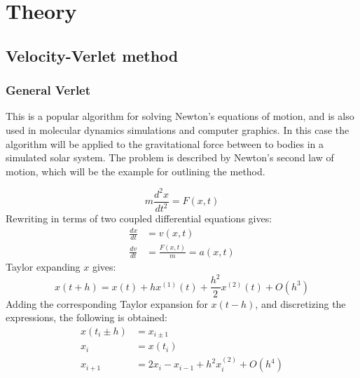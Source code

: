 \section{Theory}
\subsection{Velocity-Verlet method}
\subsubsection{General Verlet}
This is a popular algorithm for solving Newton's equations of motion, and is also used in  
molecular dynamics simulations and computer graphics. In this case the algorithm will be  
applied to the gravitational force between to bodies in a simulated solar system. 
The problem is described by Newton's second law of motion, which will be the example for outlining
the method.

\begin{equation*}
m\frac{d^2x}{dt^2}= F(x,t)
\end{equation*}
Rewriting in terms of two coupled differential equations gives:
\begin{align*}
\frac{dx}{dt} &= v(x,t) \\
\frac{dv}{dt} &= \frac{F(x,t)}{m} = a(x,t)
\end{align*}
Taylor expanding $x$ gives:
\begin{equation*}
x(t+h) = x(t) + hx^{(1)}(t) + \frac{h^2}{2}x^{{(2)}}(t) + O(h^3)
\end{equation*}
Adding the corresponding Taylor expansion for $x(t-h)$, and discretizing the expressions,
the following is obtained:
\begin{align*}
x(t_i \pm h) &= x_{i\pm 1} \\
x_i &= x(t_i) \\
x_{i+1} &= 2x_i - x_{i-1} + h^2 x_i^{{(2)}} + O(h^4)
\end{align*}
